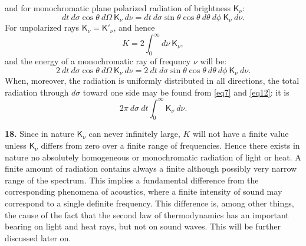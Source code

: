 \documentclass[12pt,oneside]{book}
\begin{document}
and for monochromatic plane polarized radiation of brightness $\mathsf{K}_\nu$:
\begin{equation}
    dt\ d\sigma \cos\theta\ d\Omega\ \mathsf{K}_\nu\ d\nu=dt\ d\sigma \sin\theta \cos\theta\ d\theta\ d\phi\ \mathsf{K}_\nu\ d\nu.
    \label{eq11}
\end{equation}
For unpolarized rays $\mathsf{K}_\nu=\mathsf{K}'_\nu$, and hence
\begin{equation}
    K=2\int_0^\infty d\nu\ \mathsf{K}_\nu,
    \label{eq12}
\end{equation}
and the energy of a monochromatic ray of frequncy $\nu$ will be:
\begin{equation}
    2\ dt\ d\sigma \cos\theta\ d\Omega\ \mathsf{K}_\nu\ d\nu=2\ dt\ d\sigma \sin\theta \cos\theta\ d\theta\ d\phi\ \mathsf{K}_\nu\ d\nu.
    \label{eq13}
\end{equation}
When, moreover, the radiation is uniformly distributed in all directions, the total radiation through $d\sigma$ toward one side may be found from \eqref{eq7} and \eqref{eq12}: it is
\begin{equation}
    2\pi\ d\sigma\ dt \int_0^\infty \mathsf{K}_\nu\ d\nu.
    \label{eq14}
\end{equation} \par

\textbf{18.} Since in nature $\mathsf{K}_\nu$ can never infinitely large, $K$ will not have a finite value unless $\mathsf{K}_\nu$ differs from zero over a finite range of frequencies. Hence there exists in nature no absolutely homogeneous or monochromatic radiation of light or heat. A finite amount of radiation contains always a finite although possibly very narrow range of the spectrum. This implies a fundamental difference from the corresponding phenomena of acoustics, where a finite intensity of sound may correspond to a single definite frequency. This difference is, among other things, the cause of the fact that the second law of thermodynamics has an important bearing on light and heat rays, but not on sound waves. This will be further discussed later on. \par
\end{document}
